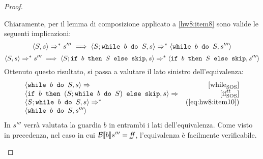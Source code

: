 \begin{proof}
\begin{itemize}
  Chiaramente, per il lemma di composizione applicato a \ref{hw8:item8} sono
  valide le seguenti implicazioni:
  \begin{equation}
  \confSs{S}{s} \Rar{*} s'''
    \implies
  \confSs{S; \wbS{b}{S}}{s} \Rar{*} \confSs{\wbS{b}{S}}{s'''}
  \label{eq:hw8:item10}
  \end{equation}
  \begin{equation}
  \confSs{S}{s} \Rar{*} s'''
    \implies
  \confSs{S; \ifABC{b}{S}{\skipForFriends}}{s} \Rar{*}
        \confSs{\ifABC{b}{S}{\skipForFriends}}{s'''}
  \label{eq:hw8:itemX}
  \end{equation}
  Ottenuto questo risultato, si passa a valutare il lato sinistro
  dell'equivalenza:
  $$
  \begin{array}{lr}
  \confSs{\wbS{b}{S}}{s} \Rar{ }  & \whileSOS \\
  \confSs{\ifABC{b}{(S;\wbS{b}{S})}{\skipForFriends}}{s} \Rar{ } & \ifttSOS\\
  \confSs{S; \wbS{b}{S}}{s} \Rar{*} & (\text{\ref{eq:hw8:item10}})\\
  \confSs{\wbS{b}{S}}{s'''}
  \end{array}
  $$
  In $s'''$ verrà valutata la guardia $b$ in entrambi i lati dell'equivalenza.
  Come visto in precedenza, nel caso in cui $\B{b}''' = \semfalse$,
  l'equivalenza è facilmente verificabile.


\end{itemize}
\end{proof}
